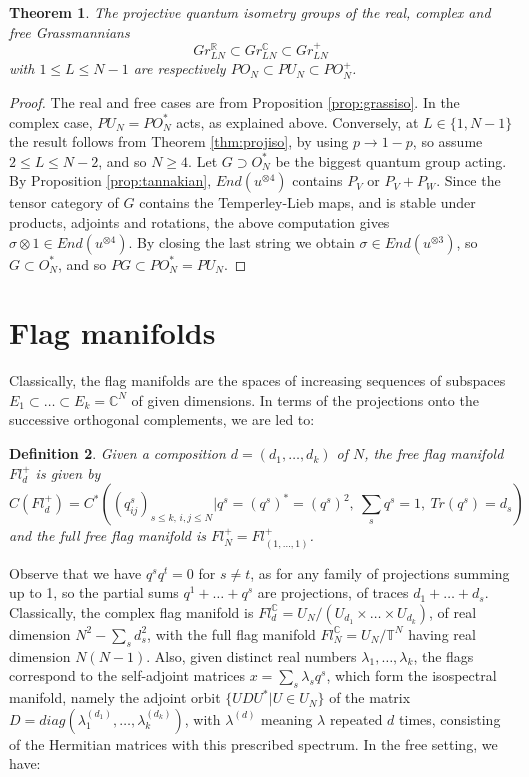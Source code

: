 \documentclass[11pt]{article}
\theoremstyle{plain}
\newtheorem{theorem}{Theorem}[section]
\newtheorem{definition}[theorem]{Definition}
\begin{document}
\begin{theorem}
\label{thm:grassiso}
The projective quantum isometry groups of the real, complex and free Grassmannians
$$Gr^\mathbb R_{LN}\subset Gr^\mathbb C_{LN}\subset Gr^+_{LN}$$
with $1\leq L\leq N-1$ are respectively $PO_N\subset PU_N\subset PO_N^+$.
\end{theorem}

\begin{proof}
The real and free cases are from Proposition \ref{prop:grassiso}. In the complex case, $PU_N=PO_N^*$ acts, as explained above. Conversely, at $L\in\{1,N-1\}$ the result follows from Theorem \ref{thm:projiso}, by using $p\to1-p$, so assume $2\leq L\leq N-2$, and so $N\geq4$. Let $G\supset O_N^*$ be the biggest quantum group acting. By Proposition \ref{prop:tannakian}, $End(u^{\otimes4})$ contains $P_V$ or $P_V+P_W$. Since the tensor category of $G$ contains the Temperley-Lieb maps, and is stable under products, adjoints and rotations, the above computation gives $\sigma\otimes1\in End(u^{\otimes4})$. By closing the last string we obtain $\sigma\in End(u^{\otimes3})$, so $G\subset O_N^*$, and so $PG\subset PO_N^*=PU_N$.
\end{proof}

\section{Flag manifolds}

Classically, the flag manifolds are the spaces of increasing sequences of subspaces $E_1\subset\ldots\subset E_k=\mathbb C^N$ of given dimensions. In terms of the projections onto the successive orthogonal complements, we are led to:

\begin{definition}
Given a composition $d=(d_1,\ldots,d_k)$ of $N$, the free flag manifold $Fl^+_d$ is given by
$$C(Fl^+_d)=C^*\left((q^s_{ij})_{s\leq k,\,i,j\leq N}\Big|q^s=(q^s)^*=(q^s)^2,\ \sum_sq^s=1,\ Tr(q^s)=d_s\right)$$
and the full free flag manifold is $Fl^+_N=Fl^+_{(1,\ldots,1)}$.
\end{definition}

Observe that we have $q^sq^t=0$ for $s\neq t$, as for any family of projections summing up to 1, so the partial sums $q^1+\ldots+q^s$ are projections, of traces $d_1+\ldots+d_s$. Classically, the complex flag manifold is $Fl^\mathbb C_d=U_N/(U_{d_1}\times\ldots\times U_{d_k})$, of real dimension $N^2-\sum_sd_s^2$, with the full flag manifold $Fl^\mathbb C_N=U_N/\mathbb T^N$ having real dimension $N(N-1)$. Also, given distinct real numbers $\lambda_1,\ldots,\lambda_k$, the flags correspond to the self-adjoint matrices $x=\sum_s\lambda_sq^s$, which form the isospectral manifold, namely the adjoint orbit $\{UDU^*|U\in U_N\}$ of the matrix $D=diag(\lambda_1^{(d_1)},\ldots,\lambda_k^{(d_k)})$, with $\lambda^{(d)}$ meaning $\lambda$ repeated $d$ times, consisting of the Hermitian matrices with this prescribed spectrum. In the free setting, we have:
\end{document}
